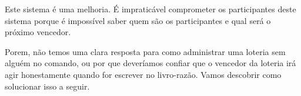 Este sistema é uma melhoria. É impraticável comprometer os participantes deste sistema porque é impossível saber quem são os participantes e qual será o próximo vencedor.

Porem, não temos uma clara resposta para como administrar uma loteria sem alguém no comando, ou por que deveríamos confiar que o vencedor da loteria irá agir honestamente quando for escrever no livro-razão. Vamos descobrir como solucionar isso a seguir.

